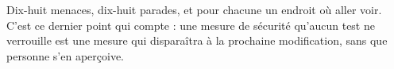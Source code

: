 \begin{retenir}
Dix-huit menaces, dix-huit parades, et pour chacune un endroit où aller voir.
C'est ce dernier point qui compte : une mesure de sécurité qu'aucun test ne
verrouille est une mesure qui disparaîtra à la prochaine modification, sans que
personne s'en aperçoive.
\end{retenir}
